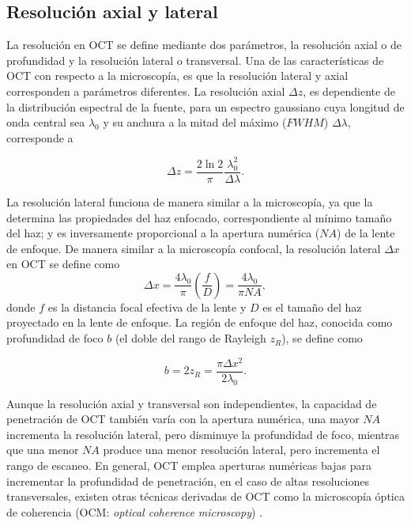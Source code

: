 \subsection{Resolución axial y lateral}

La resolución en OCT se define mediante dos parámetros, la resolución axial o de profundidad y la resolución lateral o transversal. Una de las características de OCT con respecto a la microscopía, es que la resolución lateral y axial corresponden a parámetros diferentes. La resolución axial $\Delta z$, es dependiente de la distribución espectral de la fuente, para un espectro gaussiano cuya longitud de onda central sea $\lambda_0$ y su anchura a la mitad del máximo ($FWHM$) $\Delta \lambda$, corresponde a \cite{Brezinski2005}

\begin{equation}
\Delta z = \frac{2 \ln 2}{\pi} \frac{\lambda_0^2}{\Delta \lambda}.
\end{equation}

La resolución lateral funciona de manera similar a la microscopía, ya que la determina las propiedades del haz enfocado, correspondiente al mínimo tamaño del haz; y es inversamente proporcional a la apertura numérica ($NA$) de la lente de enfoque. De manera similar a la microscopía confocal, la resolución lateral $\Delta x$ en OCT se define como \cite{Drexler2015}
\begin{equation}
\Delta x  = \frac{4\lambda_0}{\pi} \left( \frac{f}{D}\right) = \frac{4\lambda_0}{\pi NA},
\end{equation}
\noindent donde $f$ es la distancia focal efectiva de la lente y $D$ es el tamaño del haz proyectado en la lente de enfoque. La región de enfoque del haz, conocida como profundidad de foco $b$ (el doble del rango de Rayleigh $z_R$), se define como

\begin{equation}
\label{eq:depth_of_focus}
	b = 2z_R = \frac{\pi \Delta x^2}{2\lambda_0}.
\end{equation}

Aunque la resolución axial y transversal son independientes, la capacidad de penetración de OCT también varía con la apertura numérica, una mayor $NA$ incrementa la resolución lateral, pero disminuye la profundidad de foco, mientras que una menor $NA$ produce una menor resolución lateral, pero incrementa el rango de escaneo. En general, OCT emplea aperturas numéricas bajas para incrementar la profundidad de penetración, en el caso de altas resoluciones transversales, existen otras técnicas derivadas de OCT como la microscopía óptica de coherencia (OCM: \textit{optical coherence microscopy}) \cite{Beaurepaire1998}.

